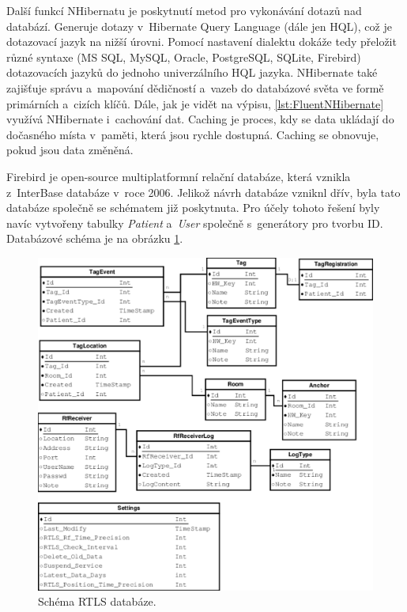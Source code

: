 Další funkcí NHibernatu je poskytnutí metod pro vykonávání dotazů nad databází. Generuje dotazy v~Hibernate Query Language (dále jen HQL), což je dotazovací jazyk na nižší úrovni. Pomocí nastavení dialektu dokáže tedy přeložit různé syntaxe (MS SQL, MySQL, Oracle, PostgreSQL, SQLite, Firebird) dotazovacích jazyků do jednoho univerzálního HQL jazyka. NHibernate také zajišťuje správu a~mapování dědičností a~vazeb do databázové světa ve formě primárních a~cizích klíčů. Dále, jak je vidět na výpisu, \ref{lst:FluentNHibernate} využívá NHibernate i~cachování dat. Caching je proces, kdy se data ukládají do dočasného místa v~paměti, která jsou rychle dostupná. Caching se obnovuje, pokud jsou data změněná. \\


Firebird je open-source multiplatformní relační databáze, která vznikla z~InterBase databáze v~roce 2006. Jelikož návrh databáze vzniknl dřív, byla tato databáze společně se schématem již poskytnuta. Pro účely tohoto řešení byly navíc vytvořeny tabulky \textit{Patient} a~\textit{User} společně s~generátory pro tvorbu ID. Databázové schéma je na obrázku \ref{fig:db}. \\

\begin{figure} [H]
	\centering
	\includegraphics[width=14cm]{../databaze.pdf}
	\caption{Schéma RTLS databáze.}
	\label{fig:db}
\end{figure}

